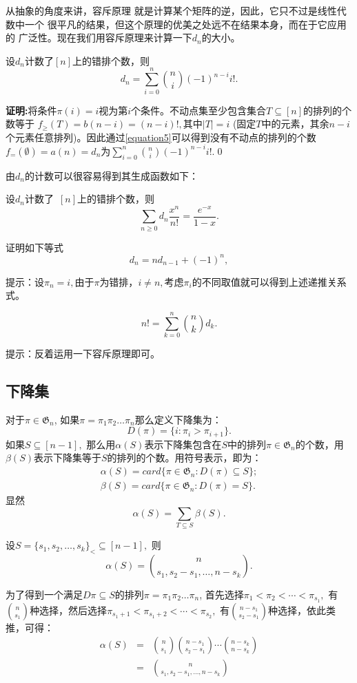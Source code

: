 从抽象的角度来讲，容斥原理
就是计算某个矩阵的逆，因此，它只不过是线性代数中一个
很平凡的结果，但这个原理的优美之处远不在结果本身，而在于它应用的
广泛性。现在我们用容斥原理来计算一下$d_n$的大小。

\begin{thm}
设$d_n$计数了$[n]$上的错排个数，则$$d_n=\sum_{i=0}^n{n\choose
i}(-1)^{n-i}i!.$$
\end{thm}
{\bf
证明:}将条件$\pi(i)=i$视为第$i$个条件。不动点集至少包含集合$T\subseteq
[n]$的排列的个数等于 $f_{\geq}(T)=b(n-i)=(n-i)!,$其中$|T|=i$
(固定$T$中的元素，其余$n-i$个元素任意排列)。因此通过\ref{equation5}可以得到没有不动点的排列的个数
$f_{=}(\emptyset)=a(n)=d_n$为$\sum_{i=0}^n{n\choose
i}(-1)^{n-i}i!.$\qed

由$d_n$的计数可以很容易得到其生成函数如下：
\begin{thm}
设$d_n$计数了~$[n]$上的错排个数，则
$$\sum_{n\ge0}d_n\frac{x^n}{n!}=\frac{e^{-x}}{1-x}.$$
\end{thm}


证明如下等式
$$d_n=nd_{n-1}+(-1)^n,$$

提示：设$\pi_n=i,$由于$\pi$为错排，$i\neq
n,$考虑$\pi_i$的不同取值就可以得到上述递推关系式。

$$n!=\sum_{k=0}^n{n\choose k}d_k.$$

提示：反着运用一下容斥原理即可。

\subsection{下降集}
对于$\pi\in\mathfrak{G}_n$,
如果$\pi=\pi_1\pi_2\ldots\pi_n$那么定义下降集为：
$$D(\pi)=\{i:\pi_i>\pi_{i+1}\}.$$
如果$S\subseteq[n-1],$
那么用$\alpha(S)$表示下降集包含在$S$中的排列$\pi\in\mathfrak{G}_n$的个数，用
$\beta(S)$表示下降集等于$S$的排列的个数。用符号表示，即为：
\begin{eqnarray*}
\alpha(S)=card\{\pi\in\mathfrak{G}_n:D(\pi)\subseteq S\};\\
\beta(S)=card\{\pi\in\mathfrak{G}_n:D(\pi)=S\}.
\end{eqnarray*}
显然
$$\alpha(S)=\sum_{T\subseteq S}\beta(S).$$
\begin{prop}
设$S=\{s_1,s_2,\ldots,s_k\}_<\subseteq[n-1],$ 则
$$\alpha(S)={n\choose s_1,s_2-s_1,\ldots,n-s_k}.$$
\end{prop}
\pf 为了得到一个满足$D{\pi}\subseteq
S$的排列$\pi=\pi_1\pi_2\ldots\pi_n$,
首先选择$\pi_1<\pi_2<\cdots<\pi_{s_1},$
 有${n\choose s_1}$种选择，然后选择$\pi_{s_1+1}<\pi_{s_1+2}<\cdots<\pi_{s_2},$ 有${n-s_1\choose s_2-s_1}$种选择，依此类推，可得：
 \begin{eqnarray*}
 \alpha(S)&=&{n\choose s_1}{n-s_1\choose s_2-s_1}\cdots{n-s_k\choose n-s_k}\\
 &=&{n\choose s_1,s_2-s_1,\ldots,n-s_k}
 \end{eqnarray*}

